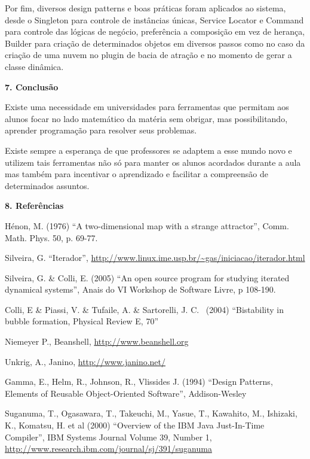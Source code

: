 \documentclass[12pt,twoside]{article}
\begin{document}
{
 Por fim, diversos design patterns e boas pr\'aticas foram aplicados ao
sistema, desde o Singleton para controle de inst\^ancias \'unicas,
Service Locator e Command para controle das l\'ogicas de neg\'ocio,
prefer\^encia a composi\c{c}\~ao em vez de heran\c{c}a, Builder para
cria\c{c}\~ao de determinados objetos em diversos passos como no caso
da cria\c{c}\~ao de uma nuvem no plugin de bacia de atra\c{c}\~ao e no
momento de gerar a classe din\^amica.}

{\bfseries
7. Conclus\~ao}

{
Existe uma necessidade em universidades para ferramentas que permitam
aos alunos focar no lado matem\'atico da mat\'eria sem obrigar, mas
possibilitando, aprender programa\c{c}\~ao para resolver seus
problemas. }

{
 Existe sempre a esperan\c{c}a de que professores se adaptem a esse
mundo novo e utilizem tais ferramentas n\~ao s\'o para manter os alunos
acordados durante a aula mas tamb\'em para incentivar o aprendizado e
facilitar a compreens\~ao de determinados assuntos.}

{\bfseries
8. Refer\^encias}

{
H\'enon, M. (1976) ``A two{}-dimensional map with a strange attractor'',
Comm. Math. Phys. 50, p. 69{}-77.}

{
Silveira, G. ``Iterador'',
\href{http://www.linux.ime.usp.br/~gas/iniciacao/iterador.html}{http://www.linux.ime.usp.br/\~{}gas/iniciacao/iterador.html}}

{
Silveira, G. \& Colli, E. (2005) ``An open source program for studying
iterated dynamical systems'', Anais do VI Workshop de Software Livre, p
108{}-190.}

{
Colli, E \& Piassi, V. \& Tufaile, A. \& Sartorelli, J. C. \ (2004)
``Bistability in bubble formation, Physical Review E, 70''}

{
Niemeyer P., Beanshell,
\href{http://www.beanshell.org/}{http://www.beanshell.org}}

{
Unkrig, A., Janino,
\href{http://www.janino.net/}{http://www.janino.net/}}

{
Gamma, E., Helm, R., Johnson, R., Vlissides J. (1994) ``Design Patterns,
Elements of Reusable Object{}-Oriented Software'', Addison{}-Wesley}

{
Suganuma, T., Ogasawara, T., Takeuchi, M., Yasue, T., Kawahito, M.,
Ishizaki, K., Komatsu, H. et al (2000) ``Overview of the IBM Java
Just{}-In{}-Time Compiler'', IBM Systems Journal Volume 39, Number 1,
\href{http://www.research.ibm.com/journal/sj/391/suganuma}{http://www.research.ibm.com/journal/sj/391/suganuma}}
\end{document}

